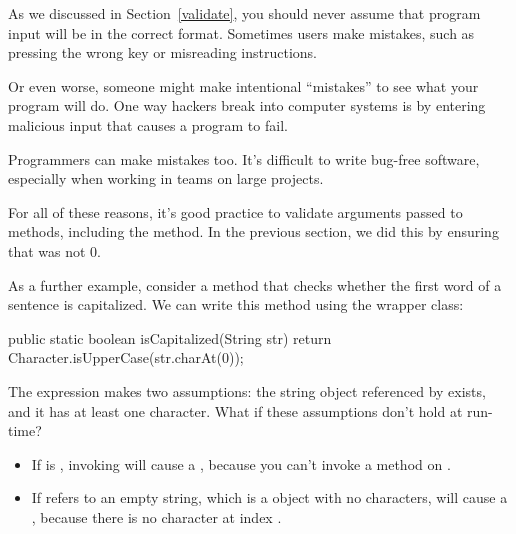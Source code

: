As we discussed in Section~\ref{validate}, you should never assume that program input will be in the correct format.
Sometimes users make mistakes, such as pressing the wrong key or misreading instructions.


Or even worse, someone might make intentional ``mistakes'' to see what your program will do.
One way hackers break into computer systems is by entering malicious input that causes a program to fail.

Programmers can make mistakes too.
It's difficult to write bug-free software, especially when working in teams on large projects.


For all of these reasons, it's good practice to validate arguments passed to methods, including the  method.
In the previous section, we did this by ensuring that  was not 0.


As a further example, consider a method that checks whether the first word of a sentence is capitalized.
We can write this method using the  wrapper class:

\begin{code}
public static boolean isCapitalized(String str) {
    return Character.isUpperCase(str.charAt(0));
}
\end{code}

The expression  makes two assumptions: the string object referenced by  exists, and it has at least one character.
What if these assumptions don't hold at run-time?


\begin{itemize}

\item If  is , invoking  will cause a , because you can't invoke a method on .

\item If  refers to an empty string, which is a  object with no characters,  will cause a , because there is no character at index .

\end{itemize}


